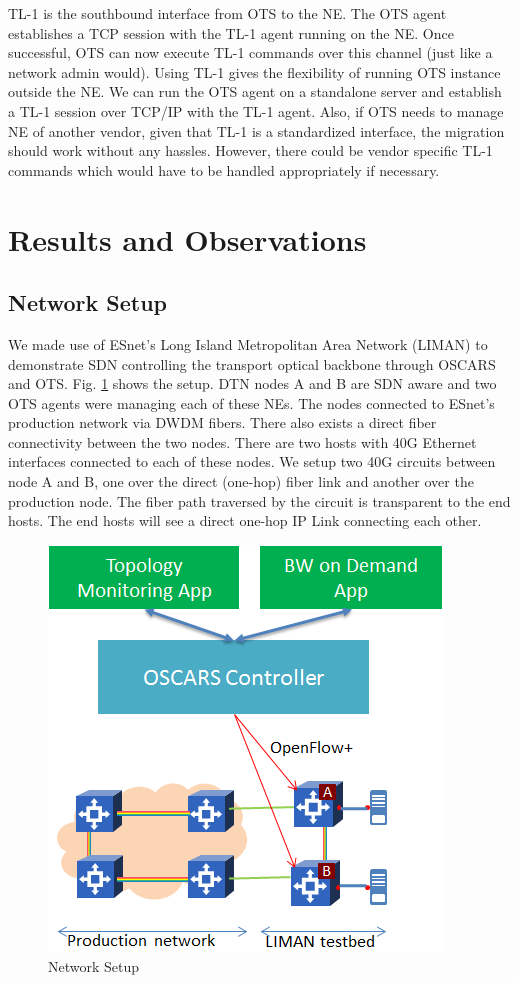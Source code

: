 \documentclass{sig-alternate-10pt}
\begin{document}
	TL-1 is the southbound interface from OTS to the NE. The OTS agent establishes a TCP session with
	the TL-1 agent running on the NE. Once successful, OTS can now execute TL-1 commands over this
	channel (just like a network admin would). Using TL-1 gives the flexibility of running OTS instance
	outside the NE. We can run the OTS agent on a standalone server and establish a TL-1 session over
	TCP/IP with the TL-1 agent. Also, if OTS needs to manage NE of another vendor, given that TL-1 is a
	standardized interface, the migration should work without any hassles. However, there could be vendor 
	specific TL-1 commands which would have to be handled appropriately if necessary.
\fi

\section{Results and Observations}
\label{sec:results}
	\subsection{Network Setup}
	\label{sec:testbed}
	We made use of ESnet's Long Island Metropolitan Area Network (LIMAN) to demonstrate SDN controlling the
	transport optical backbone through OSCARS and OTS. Fig. \ref{fig:LIMAN} shows the setup. DTN
	nodes A and B are SDN aware and two OTS agents were managing each of these NEs. The nodes connected
	to ESnet's production network via DWDM fibers. There also exists a direct fiber connectivity between the two
	nodes. There are two hosts with 40G Ethernet interfaces connected to each of these nodes. We setup two 40G 
	circuits between node A and B, one over the direct (one-hop) fiber link and another over the production node.
	The fiber path traversed by the circuit is transparent to the end hosts. The end hosts will see a direct one-hop
	IP Link connecting each other.

	\begin{figure}[htb]
	\centering
	\includegraphics[scale=0.50]{LIMAN.png}
	\caption{Network Setup}
	\label{fig:LIMAN}
	\end{figure}
\end{document}
